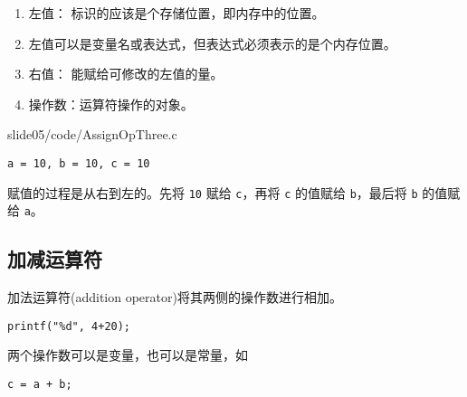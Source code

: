 \begin{frame}[fragile]\ft{\subsecname}
\begin{enumerate}
\item 左值： 标识的应该是个存储位置，即内存中的位置。\\[0.4cm]
\item[] 左值可以是变量名或表达式，但表达式必须表示的是个内存位置。\\[0.4cm]
\item 右值： 能赋给可修改的左值的量。\\[0.4cm]
\item 操作数：运算符操作的对象。
\end{enumerate}
\end{frame}


\begin{frame}[fragile]\ft{\subsecname}
  
  {slide05/code/AssignOpThree.c}
  \pause 
  

\begin{lstlisting}[backgroundcolor=\color{red!10}]    
a = 10, b = 10, c = 10  
\end{lstlisting} \pause 


赋值的过程是从右到左的。先将 \lstinline|10| 赋给 \lstinline|c|，再将 \lstinline|c| 的值赋给 \lstinline|b|，最后将 \lstinline|b| 的值赋给 \lstinline|a|。
\end{frame}

\subsection{加减运算符}
\begin{frame}[fragile]\ft{\subsecname}
加法运算符(addition operator)将其两侧的操作数进行相加。 \vspace{1em}

\begin{lstlisting}
printf("%d", 4+20);
\end{lstlisting}
\vspace{1em}

两个操作数可以是变量，也可以是常量，如
\begin{lstlisting}
c = a + b;
\end{lstlisting}
\end{frame}
 
